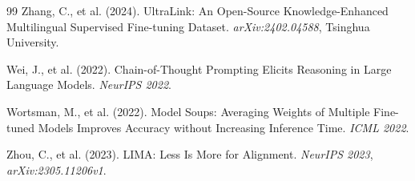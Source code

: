 \documentclass[11pt,a4paper]{article}
\begin{document}
\begin{thebibliography}{99}
Zhang, C., et al. (2024).
\newblock UltraLink: An Open-Source Knowledge-Enhanced Multilingual Supervised Fine-tuning Dataset.
\newblock \textit{arXiv:2402.04588}, Tsinghua University.

Wei, J., et al. (2022).
\newblock Chain-of-Thought Prompting Elicits Reasoning in Large Language Models.
\newblock \textit{NeurIPS 2022}.

Wortsman, M., et al. (2022).
\newblock Model Soups: Averaging Weights of Multiple Fine-tuned Models Improves Accuracy
without Increasing Inference Time.
\newblock \textit{ICML 2022}.

Zhou, C., et al. (2023).
\newblock LIMA: Less Is More for Alignment.
\newblock \textit{NeurIPS 2023}, \textit{arXiv:2305.11206v1}.

\end{thebibliography}
\end{document}
